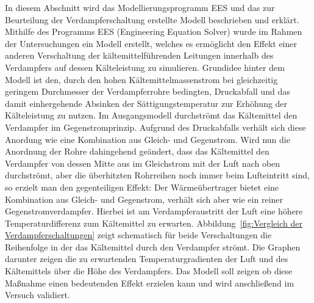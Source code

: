 In diesem Abschnitt wird das Modellierungsprogramm EES und das zur Beurteilung der Verdampferschaltung erstellte Modell beschrieben und erklärt.
Mithilfe des Programms EES (Engineering Equation Solver) wurde im Rahmen der Untersuchungen ein Modell erstellt, welches es ermöglicht den Effekt einer anderen Verschaltung der kältemittelführenden Leitungen innerhalb des Verdampfers auf dessen Kälteleistung zu simulieren. Grundidee hinter dem Modell ist den, durch den hohen Kältemittelmassenstrom bei gleichzeitig geringem Durchmesser der Verdampferrohre bedingten, Druckabfall und das damit einhergehende Absinken der Sättigungstemperatur zur Erhöhung der Kälteleistung zu nutzen. Im Ausgangsmodell durchströmt das Kältemittel den Verdampfer im Gegenstromprinzip. Aufgrund des Druckabfalls verhält sich diese Anordung wie eine Kombination aus Gleich- und Gegenstrom. Wird nun die Anordnung der Rohre dahingehend geändert, dass das Kältemittel den Verdampfer von dessen Mitte aus im Gleichstrom mit der Luft nach oben durchströmt, aber die überhitzten Rohrreihen noch immer beim Lufteintritt sind, so erzielt man den gegenteiligen Effekt: Der Wärmeübertrager bietet eine Kombination aus Gleich- und Gegenstrom, verhält sich aber wie ein reiner Gegenstromverdampfer. Hierbei ist am Verdampferaustritt der Luft eine höhere Temperaturdifferenz zum Kältemittel zu erwarten. Abbildung~\ref{fig:Vergleich der Verdampferschaltungen} zeigt schematisch für beide Verschaltungen die Reihenfolge in der das Kältemittel durch den Verdampfer strömt. Die Graphen darunter zeigen die zu erwartenden Temperaturgradienten der Luft und des Kältemittels über die Höhe des Verdampfers. \newline
Das Modell soll zeigen ob diese Maßnahme einen bedeutenden Effekt erzielen kann und wird anschließend im Versuch validiert.


